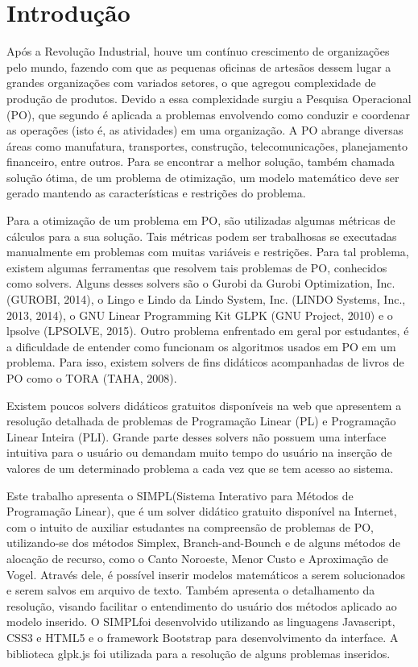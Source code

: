 \documentclass [11pt]{articleSBPO}
\newcommand{\sigla}[0] {SIMPL}
\newcommand{\nome}[0] {Sistema Interativo para Métodos de Programação Linear}
\begin{document}
\newpage

\section{Introdução}\label{sec:introducao}
Após a Revolução Industrial, houve um contínuo crescimento de organizações pelo mundo, fazendo com que as pequenas oficinas de artesãos dessem lugar a grandes organizações com variados setores, o que agregou complexidade de produção de produtos. Devido a essa complexidade surgiu a Pesquisa Operacional (PO), que segundo \cite{hillier} é aplicada a problemas envolvendo como conduzir e coordenar as operações (isto é, as atividades) em uma organização. A PO abrange diversas áreas como manufatura, transportes, construção, telecomunicações, planejamento financeiro, entre outros. Para se encontrar a melhor solução, também chamada solução ótima, de um problema de otimização, um modelo matemático deve ser gerado mantendo as características e restrições do problema.

Para a otimização de um problema em PO, são utilizadas algumas métricas de cálculos para a sua solução. Tais métricas podem ser trabalhosas se executadas manualmente em problemas com muitas variáveis e restrições. Para tal problema, existem algumas ferramentas que resolvem tais problemas de PO, conhecidos como solvers. Alguns desses solvers são o Gurobi da Gurobi Optimization, Inc. (GUROBI, 2014), o Lingo e Lindo da Lindo System, Inc. (LINDO Systems, Inc., 2013, 2014), o GNU Linear Programming Kit GLPK (GNU Project, 2010) e o lpsolve (LPSOLVE, 2015). Outro problema enfrentado em geral por estudantes, é a dificuldade de entender como funcionam os algoritmos usados em PO em um problema. Para isso, existem solvers de fins didáticos acompanhadas de livros de PO como o TORA (TAHA, 2008). 

Existem poucos solvers didáticos gratuitos disponíveis na web que apresentem a resolução detalhada de problemas de Programação Linear (PL) e Programação Linear Inteira (PLI). Grande parte desses solvers não possuem uma interface intuitiva para o usuário ou demandam muito tempo do usuário na inserção de valores de um determinado problema a cada vez que se tem acesso ao sistema.

Este trabalho apresenta o \sigla (\nome), que é um solver didático gratuito disponível na Internet, com o intuito de auxiliar estudantes na compreensão de problemas de PO, utilizando-se dos métodos Simplex, Branch-and-Bounch e de alguns métodos de alocação de recurso, como o Canto Noroeste, Menor Custo e Aproximação de Vogel. Através dele, é possível inserir modelos matemáticos a serem solucionados e serem salvos em arquivo de texto. Também apresenta o detalhamento da resolução, visando facilitar o entendimento do usuário dos métodos aplicado ao modelo inserido. O \sigla foi desenvolvido utilizando as linguagens Javascript, CSS3 e HTML5 e o framework Bootstrap para desenvolvimento da interface. A biblioteca glpk.js foi utilizada para a resolução de alguns problemas inseridos.
\end{document}
